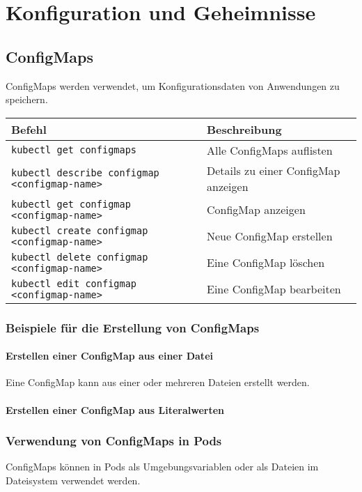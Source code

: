 \chapter{Konfiguration und Geheimnisse}
\section{ConfigMaps}
ConfigMaps werden verwendet, um Konfigurationsdaten von Anwendungen zu speichern.\\

\noindent
\begin{tabularx}{\textwidth}{|X|X|}
\hline
\textbf{Befehl} & \textbf{Beschreibung} \\
\hline
\texttt{kubectl get configmaps} & Alle ConfigMaps auflisten \\
\texttt{kubectl describe configmap <configmap-name>} & Details zu einer ConfigMap anzeigen \\
\texttt{kubectl get configmap <configmap-name>} & ConfigMap anzeigen\\
\texttt{kubectl create configmap <configmap-name>} & Neue ConfigMap erstellen \\
\texttt{kubectl delete configmap <configmap-name>} & Eine ConfigMap löschen \\
\texttt{kubectl edit configmap <configmap-name>} & Eine ConfigMap bearbeiten\\
\hline
\end{tabularx}

\subsection{Beispiele für die Erstellung von ConfigMaps}

\subsubsection{Erstellen einer ConfigMap aus einer Datei}
Eine ConfigMap kann aus einer oder mehreren Dateien erstellt werden.


\subsubsection{Erstellen einer ConfigMap aus Literalwerten}


\subsection{Verwendung von ConfigMaps in Pods}
ConfigMaps können in Pods als Umgebungsvariablen oder als Dateien im Dateisystem verwendet werden.

